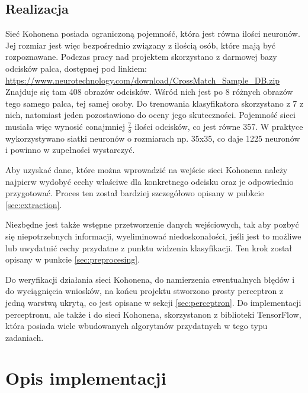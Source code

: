 \documentclass[12pt, notitlepage]{article}
\begin{document}
\subsection{Realizacja}

Sieć Kohonena posiada ograniczoną pojemność, która jest równa ilości neuronów. Jej rozmiar jest więc bezpośrednio związany z ilością osób, które mają być rozpoznawane. Podczas pracy nad projektem skorzystano z darmowej bazy odcisków palca, dostępnej pod linkiem:\newline
{
    \parskip=0pt
        \url{
            https://www.neurotechnology.com/download/CrossMatch_Sample_DB.zip
        }
}
\newline
Znajduje się tam 408 obrazów odcisków. Wśród nich jest po 8 różnych obrazów tego samego palca, tej samej osoby. Do trenowania klasyfikatora skorzystano z 7 z nich, natomiast jeden pozostawiono do oceny jego skuteczności. Pojemność sieci musiała więc wynosić conajmniej \( \frac{7}{8} \) ilości odcisków, co jest równe 357. W praktyce wykorzystywano siatki neuronów o rozmiarach np. 35x35, co daje 1225 neuronów i powinno w zupełności wystarczyć.

Aby uzyskać dane, które można wprowadzić na wejście sieci Kohonena należy najpierw wydobyć cechy właściwe dla konkretnego odcisku oraz je odpowiednio przygotować. Proces ten został bardziej szczegółowo opisany w pubkcie \ref{sec:extraction}.

Niezbędne jest także wstępne przetworzenie danych wejściowych, tak aby pozbyć się niepotrzebnych informacji, wyeliminować niedoskonałości, jeśli jest to możliwe lub uwydatnić cechy przydatne z punktu widzenia klasyfikacji. Ten krok został opisany w punkcie \ref{sec:preprocesing}.

Do weryfikacji działania sieci Kohonena, do namierzenia ewentualnych błędów i do wyciągnięcia wniosków, na końcu projektu stworzono prosty perceptron z jedną warstwą ukrytą, co jest opisane w sekcji \ref{sec:perceptron}. Do implementacji perceptronu, ale także i do sieci Kohonena, skorzystanon z biblioteki TensorFlow, która posiada wiele wbudowanych algorytmów przydatnych w tego typu zadaniach. 

\section{Opis implementacji}
\end{document}
